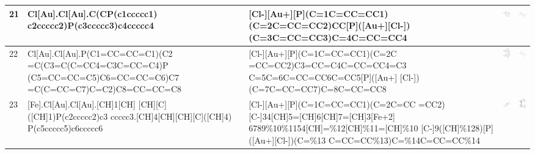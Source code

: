 \begin{landscape}
\begin{longtable}{m{0.3cm}m{6.7cm}m{7.7cm}m{2.3cm}m{2.3cm}}
 21 &
 Cl[Au].Cl[Au].C(CP(c1ccccc1) c2ccccc2)P(c3ccccc3)c4ccccc4 & 
 [Cl-][Au+][P](C=1C=CC=CC1) (C=2C=CC=CC2)CC[P]([Au+][Cl-]) (C=3C=CC=CC3)C=4C=CC=CC4 & 
 \includegraphics[width=2.2cm]{imagenes/sigmaAldrich/Dichloro(DPPE)digold(I).jpeg} & 
 \includegraphics[width=2.2cm]{imagenes/sciFinder/pdf/Dichloro(DPPE)digold(I).pdf} \\
\hline


 22 &
 Cl[Au].Cl[Au].P(C1=CC=CC=C1)(C2 =C(C3=C(C=CC4=C3C=CC=C4)P (C5=CC=CC=C5)C6=CC=CC=C6)C7 =C(C=CC=C7)C=C2)C8=CC=CC=C8 & 
 [Cl-][Au+][P](C=1C=CC=CC1)(C=2C =CC=CC2)C3=CC=C4C=CC=CC4=C3 C=5C=6C=CC=CC6C=CC5[P]([Au+] [Cl-])(C=7C=CC=CC7)C=8C=CC=CC8 & 
 \includegraphics[width=2.2cm]{imagenes/sigmaAldrich/Dichloro[(±)−BINAP]digold(I).png} & 
 \includegraphics[width=2.2cm]{imagenes/sciFinder/pdf/Dichloro[(±)−BINAP]digold(I).pdf} \\
\hline


 23 &
 [Fe].Cl[Au].Cl[Au].[CH]1[CH] [CH][C]([CH]1)P(c2ccccc2)c3 ccccc3.[CH]4[CH][CH][C]([CH]4) P(c5ccccc5)c6ccccc6 & 
 [Cl-][Au+][P](C=1C=CC=CC1)(C=2C=CC =CC2)[C-]34[CH]5=[CH]6[CH]7=[CH]3[Fe+2] 6789\%10\%1154[CH]=\%12[CH]\%11=[CH]\%10 [C-]9([CH]\%128)[P]([Au+][Cl-])(C=\%13 C=CC=CC\%13)C=\%14C=CC=CC\%14 & 
 \includegraphics[width=2.5cm]{imagenes/sigmaAldrich/pdf/Bis(chlorogold(I)) [1,1-bis(diphenylphosphino)ferrocene.png} & 
 \includegraphics[width=2.2cm]{imagenes/sciFinder/pdf/Bis(chlorogold(I)) [1,1-bis(diphenylphosphino)ferrocene].pdf} \\
\hline



\end{longtable}
\end{landscape}
